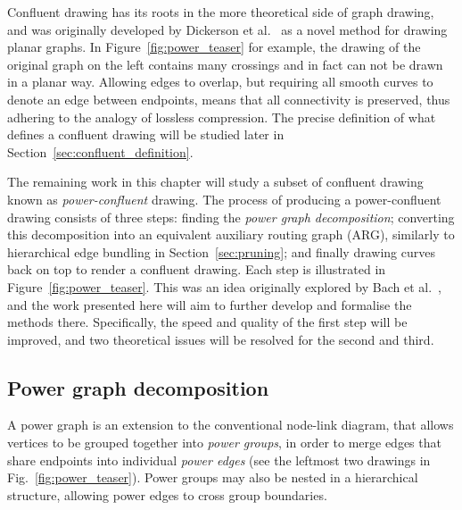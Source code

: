 Confluent drawing has its roots in the more theoretical side of graph drawing, and was originally developed by Dickerson et al.\ \cite{Dickerson2005} as a novel method for drawing planar graphs. In Figure~\ref{fig:power_teaser} for example, the drawing of the original graph on the left contains many crossings and in fact can not be drawn in a planar way. Allowing edges to overlap, but requiring all smooth curves to denote an edge between endpoints, means that all connectivity is preserved, thus adhering to the analogy of lossless compression.
The precise definition of what defines a confluent drawing will be studied later in Section~\ref{sec:confluent_definition}.

The remaining work in this chapter will study a subset of confluent drawing known as \emph{power-confluent} drawing.
The process of producing a power-confluent drawing consists of three steps: finding the \emph{power graph decomposition}; converting this decomposition into an equivalent auxiliary routing graph (ARG), similarly to hierarchical edge bundling in Section~\ref{sec:pruning}; and finally drawing curves back on top to render a confluent drawing. Each step is illustrated in Figure~\ref{fig:power_teaser}. This was an idea originally explored by Bach et al.\ \cite{Bach2017}, and the work presented here will aim to further develop and formalise the methods there.
Specifically, the speed and quality of the first step will be improved, and two theoretical issues will be resolved for the second and third.

\subsection{Power graph decomposition}
\label{sec:power_graph}
A power graph is an extension to the conventional node-link diagram, that allows vertices to be grouped together into \emph{power groups}, in order to merge edges that share endpoints into individual \emph{power edges} (see the leftmost two drawings in Fig.~\ref{fig:power_teaser}). Power groups may also be nested in a hierarchical structure, allowing power edges to cross group boundaries.


